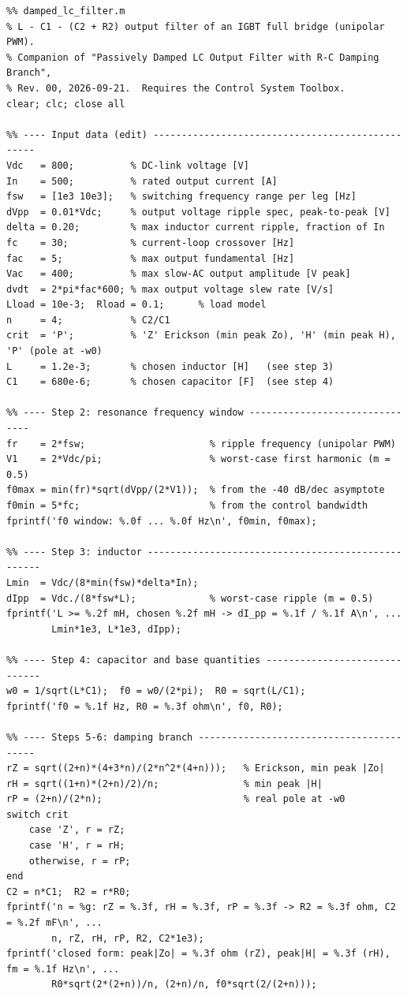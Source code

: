 \documentclass[11pt,a4paper]{article}
\begin{document}
\begin{lstlisting}
%% damped_lc_filter.m
% L - C1 - (C2 + R2) output filter of an IGBT full bridge (unipolar PWM).
% Companion of "Passively Damped LC Output Filter with R-C Damping Branch",
% Rev. 00, 2026-09-21.  Requires the Control System Toolbox.
clear; clc; close all

%% ---- Input data (edit) -------------------------------------------------
Vdc   = 800;          % DC-link voltage [V]
In    = 500;          % rated output current [A]
fsw   = [1e3 10e3];   % switching frequency range per leg [Hz]
dVpp  = 0.01*Vdc;     % output voltage ripple spec, peak-to-peak [V]
delta = 0.20;         % max inductor current ripple, fraction of In
fc    = 30;           % current-loop crossover [Hz]
fac   = 5;            % max output fundamental [Hz]
Vac   = 400;          % max slow-AC output amplitude [V peak]
dvdt  = 2*pi*fac*600; % max output voltage slew rate [V/s]
Lload = 10e-3;  Rload = 0.1;      % load model
n     = 4;            % C2/C1
crit  = 'P';          % 'Z' Erickson (min peak Zo), 'H' (min peak H), 'P' (pole at -w0)
L     = 1.2e-3;       % chosen inductor [H]   (see step 3)
C1    = 680e-6;       % chosen capacitor [F]  (see step 4)

%% ---- Step 2: resonance frequency window -------------------------------
fr    = 2*fsw;                      % ripple frequency (unipolar PWM)
V1    = 2*Vdc/pi;                   % worst-case first harmonic (m = 0.5)
f0max = min(fr)*sqrt(dVpp/(2*V1));  % from the -40 dB/dec asymptote
f0min = 5*fc;                       % from the control bandwidth
fprintf('f0 window: %.0f ... %.0f Hz\n', f0min, f0max);

%% ---- Step 3: inductor ---------------------------------------------------
Lmin  = Vdc/(8*min(fsw)*delta*In);
dIpp  = Vdc./(8*fsw*L);             % worst-case ripple (m = 0.5)
fprintf('L >= %.2f mH, chosen %.2f mH -> dI_pp = %.1f / %.1f A\n', ...
        Lmin*1e3, L*1e3, dIpp);

%% ---- Step 4: capacitor and base quantities ------------------------------
w0 = 1/sqrt(L*C1);  f0 = w0/(2*pi);  R0 = sqrt(L/C1);
fprintf('f0 = %.1f Hz, R0 = %.3f ohm\n', f0, R0);

%% ---- Steps 5-6: damping branch -----------------------------------------
rZ = sqrt((2+n)*(4+3*n)/(2*n^2*(4+n)));   % Erickson, min peak |Zo|
rH = sqrt((1+n)*(2+n)/2)/n;               % min peak |H|
rP = (2+n)/(2*n);                         % real pole at -w0
switch crit
    case 'Z', r = rZ;
    case 'H', r = rH;
    otherwise, r = rP;
end
C2 = n*C1;  R2 = r*R0;
fprintf('n = %g: rZ = %.3f, rH = %.3f, rP = %.3f -> R2 = %.3f ohm, C2 = %.2f mF\n', ...
        n, rZ, rH, rP, R2, C2*1e3);
fprintf('closed form: peak|Zo| = %.3f ohm (rZ), peak|H| = %.3f (rH), fm = %.1f Hz\n', ...
        R0*sqrt(2*(2+n))/n, (2+n)/n, f0*sqrt(2/(2+n)));


\end{lstlisting}
\end{document}
